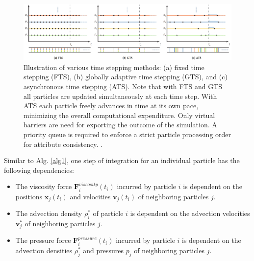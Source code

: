 \documentclass[
	11pt, 
	DIV10,
	ngerman,
	a4paper, 
	oneside, 
	headings=normal, 
	captions=tableheading,
	final, 
	numbers=noenddot
]{scrartcl}
\begin{document}
\begin{figure}[tb]
	\centering
	\includegraphics[scale=0.16]{images/4}
	\caption{\label{fig3} Illustration of various time stepping methods: (a) fixed time stepping (FTS), (b) globally adaptive time stepping (GTS), and (c) asynchronous time stepping (ATS). Note that with FTS and GTS all particles are updated simultaneously at each time step. With ATS each particle freely advances in time at its own pace, minimizing the overall computational expenditure. Only virtual barriers are need for exporting the outcome of the simulation. A priority queue is required to enforce a strict particle processing order for attribute consistency. \cite{reinhardt2017fully}.}
\end{figure}

\par
Similar to Alg. \ref{alg1}, one step of integration for an individual particle has the following dependencies:

\begin{itemize}
    \item The viscosity force $ \boldsymbol{F}_{i}^{viscosity}(t_{i}) $ incurred by particle $i$ is dependent on the positions $ \boldsymbol{x}_{j}(t_{i}) $ and velocities $ \boldsymbol{v}_{j}(t_{i}) $ of neighboring particles $j$.
    \item The advection density $ \rho_{i}^{*} $ of particle $i$ is dependent on the advection velocities $ \boldsymbol{v}_{j}^{*} $ of neighboring particles $j$.
    \item The pressure force $ \boldsymbol{F}_{i}^{pressure}(t_{i}) $ incurred by particle $i$ is dependent on the advection densities $ \rho_{j}^{*} $ and pressures $ p_{j} $ of neighboring particles $j$.
\end{itemize}
\end{document}
